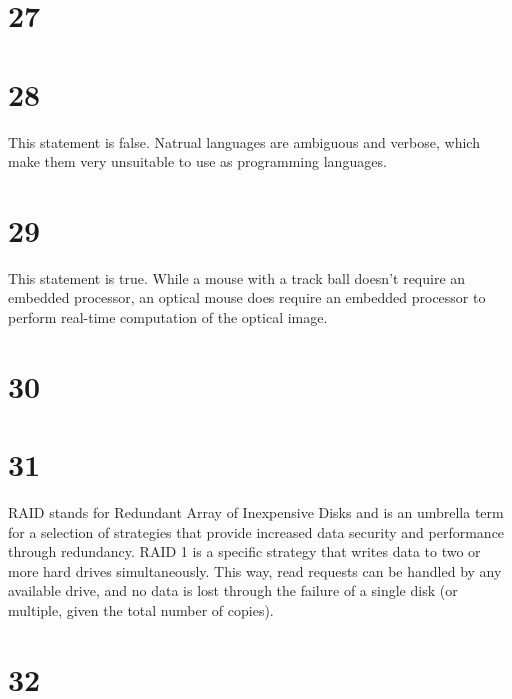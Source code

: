 \documentclass[a4paper,11pt]{article}
\begin{document}

\section*{27}


\section*{28}
This statement is false.  Natrual languages are ambiguous and verbose, which make them very unsuitable to use as programming languages.


\section*{29}
This statement is true.  While a mouse with a track ball doesn't require an embedded processor, an optical mouse does require an embedded processor to perform real-time computation of the optical image. 


\section*{30}


\section*{31}
RAID stands for Redundant Array of Inexpensive Disks and is an umbrella term for a selection of strategies that provide increased data security and performance through redundancy.  RAID 1 is a specific strategy that writes data to two or more hard drives simultaneously.  This way, read requests can be handled by any available drive, and no data is lost through the failure of a single disk (or multiple, given the total number of copies).
 

\section*{32}
\end{document}

